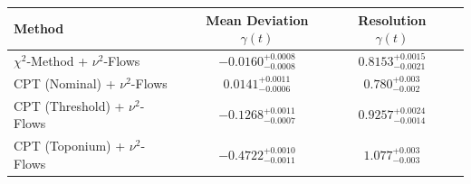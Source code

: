    \begin{tabular}{lccc}
        \toprule
        Method & Mean Deviation $\gamma(t)$ & Resolution $\gamma(t)$ \\
        \midrule
        $\chi^2$-Method + $\nu^2$-Flows & $-0.0160^{+0.0008}_{-0.0008}$ & $0.8153^{+0.0015}_{-0.0021}$ \\
        CPT (Nominal) + $\nu^2$-Flows & $0.0141^{+0.0011}_{-0.0006}$ & $0.780^{+0.003}_{-0.002}$ \\
        CPT (Threshold) + $\nu^2$-Flows & $-0.1268^{+0.0011}_{-0.0007}$ & $0.9257^{+0.0024}_{-0.0014}$ \\
        CPT (Toponium) + $\nu^2$-Flows & $-0.4722^{+0.0010}_{-0.0011}$ & $1.077^{+0.003}_{-0.003}$ \\
        \bottomrule
    \end{tabular}